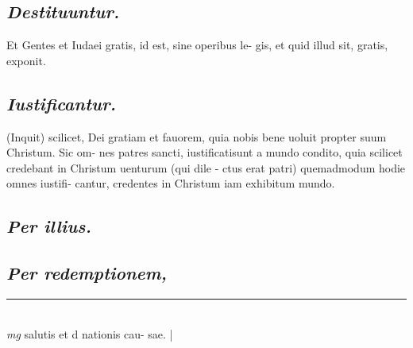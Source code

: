 \documentclass{article}
\begin{document}
\begin{pages}
\subsection*{\textit{Destituuntur. }}\pstart Et Gentes et Iudaei gratis, id est, sine operibus le- gis, et quid illud sit, gratis, exponit.   \pend
{}
{}
\subsection*{\textit{Iustificantur. }}\pstart (Inquit) scilicet, Dei gratiam et fauorem, quia nobis bene uoluit propter suum Christum. Sic om- nes patres sancti, iustificatisunt a mundo condito, quia scilicet credebant in Christum uenturum (qui dile - ctus erat patri) quemadmodum hodie omnes iustifi- cantur, credentes in Christum iam exhibitum mundo.   \pend
{}
{}
\subsection*{\textit{Per illius. }}
{}
\subsection*{\textit{Per redemptionem, }}
\vspace{0.5cm}\noindent
\vspace{0.2cm}\rule{1cm}{0.2pt}\\ 
\hspace{0.2cm}\textit{mg}
\footnotesize salutis et d nationis cau- sae. 
\normalsize| 

\end{pages}
\end{document}
